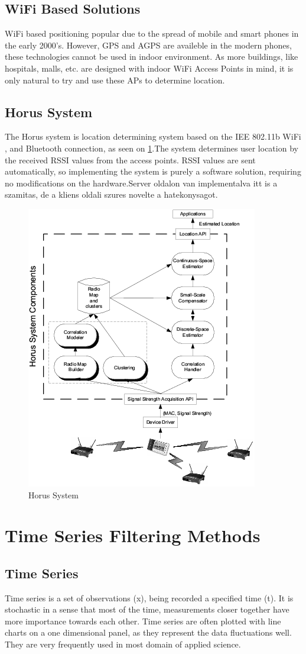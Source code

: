 \subsection{WiFi Based Solutions}
WiFi \cite{chen2002signal}based positioning popular due to the spread of mobile and smart phones in the early 2000's. However, GPS and AGPS are availeble in the modern phones, these technologies cannot be used in indoor environment. As more buildings, like hospitals, malls, etc. are designed with indoor WiFi Access Points in mind, it is only natural to try and use these APs to determine location.
\subsection{Horus System}
The Horus\cite{youssef2005horus} system is location determining system based on the IEE 802.11b WiFi , and Bluetooth connection, as seen on \ref{fig:horusimage}.The system determines user location by the received RSSI values from the access points. RSSI values are sent automatically, so implementing the system is purely a software solution, requiring no modifications on the hardware.Server oldalon van implementalva itt is a szamitas, de a kliens oldali szures novelte a hatekonysagot.
\begin{figure}[!h]
	\centering
		\includegraphics[width=.55\linewidth]{figures/Horus.png}
		\caption{Horus System \cite{HORUS}}\label{fig:horusimage}
\end{figure}


\section{Time Series Filtering Methods}
\subsection{Time Series}
Time series \cite{kalman1960new}\cite{durbin2012time} is a set of observations (x), being recorded a specified time (t).
It is stochastic in a sense that most of the time, measurements closer together have more importance towards each other.
Time series are often plotted with line charts on a one dimensional panel, as they represent the data fluctuations well.
They are very frequently used in most domain of applied science.

